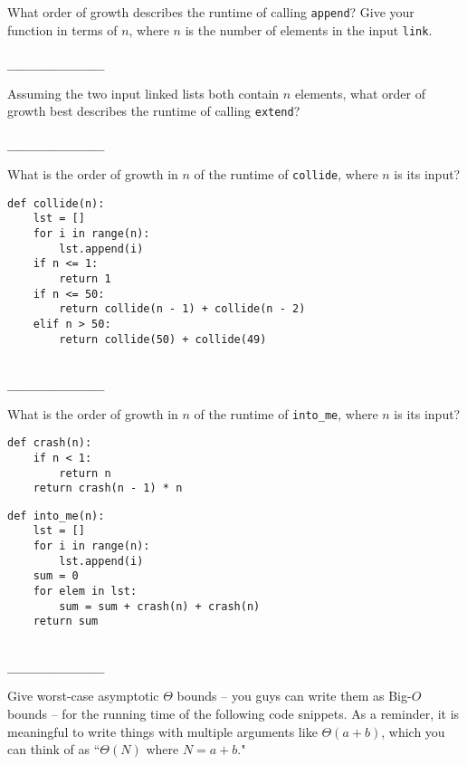 \documentclass[twoside]{article}
\begin{document}
\begin{enumerate}
\begin{enumerate}
What order of growth describes the runtime of calling \texttt{append}? Give your function in terms of $n$, where $n$ is the number of elements in the input \texttt{link}.
~\\\\
\lstinline{_______________}

Assuming the two input linked lists both contain $n$ elements, what order of growth best describes the runtime of calling \texttt{extend}?
~\\\\
\lstinline{_______________}
\end{enumerate}


\begin{enumerate}
What is the order of growth in $n$ of the runtime of \texttt{collide}, where $n$ is its input?

\begin{lstlisting}
def collide(n):
    lst = []
    for i in range(n):
        lst.append(i)
    if n <= 1:
        return 1
    if n <= 50:
        return collide(n - 1) + collide(n - 2)
    elif n > 50:
        return collide(50) + collide(49)
\end{lstlisting}
~\\
\lstinline{_______________}

What is the order of growth in $n$ of the runtime of \texttt{into\_me}, where $n$ is its input?

\begin{lstlisting}
def crash(n):
    if n < 1:
        return n
    return crash(n - 1) * n
\end{lstlisting}

\newpage

\begin{lstlisting}
def into_me(n):
    lst = []
    for i in range(n):
        lst.append(i)
    sum = 0
    for elem in lst:
        sum = sum + crash(n) + crash(n)
    return sum
\end{lstlisting}
~\\
\lstinline{_______________}
\end{enumerate}


Give worst-case asymptotic $\Theta$ bounds -- you guys can write them as Big-$O$ bounds -- for the running time of the following code snippets. As a reminder, it is meaningful to write things with multiple arguments like $\Theta(a + b)$, which you can think of as ``$\Theta(N)$ where $N = a + b$."


\end{enumerate}
\end{document}
